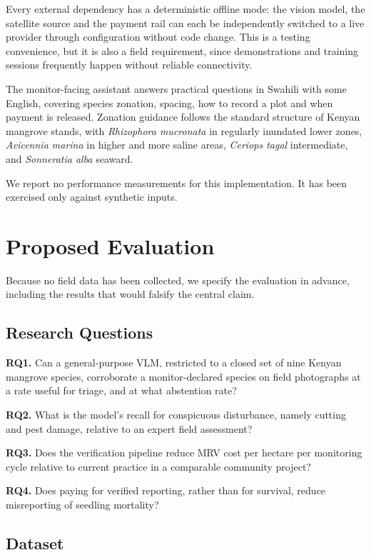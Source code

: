 \documentclass[10pt,twocolumn,a4paper]{article}
\begin{document}
Every external dependency has a deterministic offline mode: the vision model,
the satellite source and the payment rail can each be independently switched to
a live provider through configuration without code change. This is a testing
convenience, but it is also a field requirement, since demonstrations and
training sessions frequently happen without reliable connectivity.

The monitor-facing assistant answers practical questions in Swahili with some
English, covering species zonation, spacing, how to record a plot and when
payment is released. Zonation guidance follows the standard structure of Kenyan
mangrove stands, with \emph{Rhizophora mucronata} in regularly inundated lower
zones, \emph{Avicennia marina} in higher and more saline areas, \emph{Ceriops
tagal} intermediate, and \emph{Sonneratia alba} seaward.

We report no performance measurements for this implementation. It has been
exercised only against synthetic inputs.

\section{Proposed Evaluation}
\label{sec:eval}

Because no field data has been collected, we specify the evaluation in advance,
including the results that would falsify the central claim.

\subsection{Research Questions}

\textbf{RQ1.} Can a general-purpose VLM, restricted to a closed set of nine
Kenyan mangrove species, corroborate a monitor-declared species on field
photographs at a rate useful for triage, and at what abstention rate?

\textbf{RQ2.} What is the model's recall for conspicuous disturbance, namely
cutting and pest damage, relative to an expert field assessment?

\textbf{RQ3.} Does the verification pipeline reduce MRV cost per hectare per
monitoring cycle relative to current practice in a comparable community project?

\textbf{RQ4.} Does paying for verified reporting, rather than for survival,
reduce misreporting of seedling mortality?

\subsection{Dataset}
\end{document}
